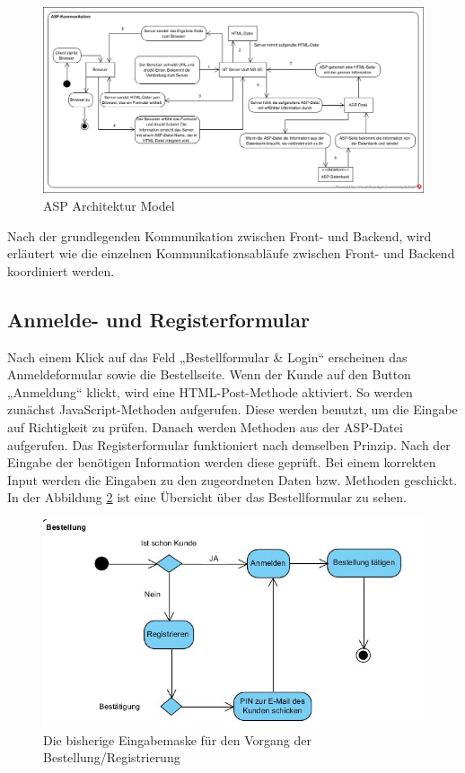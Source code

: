 \begin{figure}[h]
	\centering
	\includegraphics[width=0.9\linewidth]{Graphics/ASPArchitectur.png}
	\caption[ASPArchitectur]{ASP Architektur Model}
	\label{fig:ASPArchitectur}
\end{figure}

Nach der grundlegenden Kommunikation zwischen Front- und Backend, wird erläutert wie die einzelnen Kommunikationsabläufe zwischen Front- und Backend koordiniert werden.

\subsection{Anmelde- und Registerformular} 

Nach einem Klick auf das Feld „Bestellformular \& Login“ erscheinen das Anmeldeformular sowie die Bestellseite. Wenn der Kunde auf den Button „Anmeldung“ klickt, wird eine HTML-Post-Methode aktiviert. So werden zunächst JavaScript-Methoden aufgerufen. Diese werden benutzt, um die Eingabe auf Richtigkeit zu prüfen. Danach werden Methoden aus der ASP-Datei aufgerufen.
Das Registerformular funktioniert nach demselben Prinzip. Nach der Eingabe der benötigen Information werden diese geprüft. Bei einem korrekten Input werden die Eingaben zu den zugeordneten Daten bzw. Methoden geschickt. In der Abbildung \ref{fig:Bestellung} ist eine Übersicht über das Bestellformular zu sehen.

\begin{figure}[h]
	\centering
	\includegraphics[width=0.9\linewidth]{Graphics/Bestellung.JPG}
	\caption[Anmeldung/Bestellung]{Die bisherige Eingabemaske für den Vorgang der Bestellung/Registrierung}
	\label{fig:Bestellung}
\end{figure}

